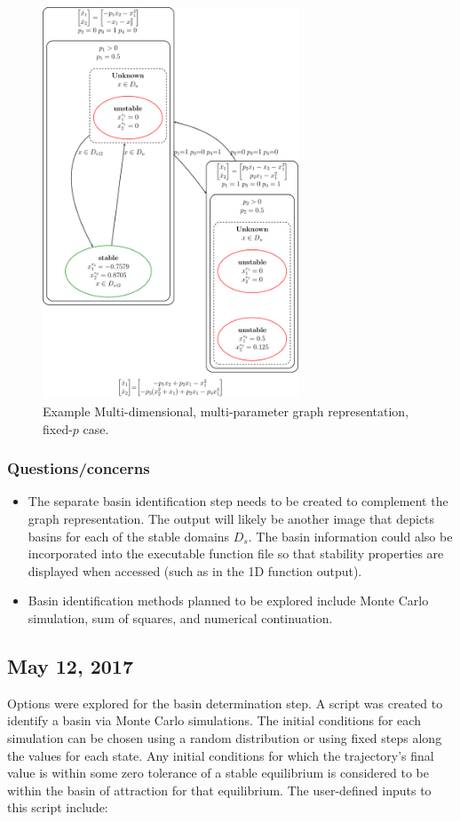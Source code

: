 \documentclass[12pt]{article}
\begin{document}
\begin{figure}[H]
\begin{center}
\includegraphics[width=3in]{may05_graph_MDMP2.pdf}
\caption{Example Multi-dimensional, multi-parameter graph representation, fixed-$p$ case.}
\label{may05_graph_MDMP2}
\end{center}
\end{figure}


\subsubsection{Questions/concerns}
\begin{itemize}
\item The separate basin identification step needs to be created to complement the graph representation. The output will likely be another image that depicts basins for each of the stable domains $D_s$. The basin information could also be incorporated into the executable function file so that stability properties are displayed when accessed (such as in the 1D function output). 
\item Basin identification methods planned to be explored include Monte Carlo simulation, sum of squares, and numerical continuation.
\end{itemize}


\subsection{May 12, 2017}
Options were explored for the basin determination step. A script was created to identify a basin via Monte Carlo simulations. The initial conditions for each simulation can be chosen using a random distribution or using fixed steps along the values for each state. Any initial conditions for which the trajectory's final value is within some zero tolerance of a stable equilibrium is considered to be within the basin of attraction for that equilibrium. The user-defined inputs to this script include: 
\end{document}

